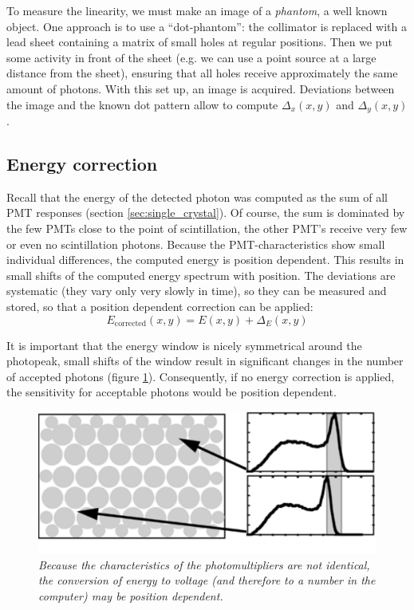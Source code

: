 To measure the linearity, we must make an image of a {\em phantom}, a well
known object. One approach is to use a ``dot-phantom'': the collimator is
replaced with a lead sheet containing a matrix of small holes at regular
positions. Then we put some activity in front of the sheet (e.g. we can use a
point source at a large distance from the sheet), ensuring that all holes
receive approximately the same amount of photons. With this set up, an image
is acquired. Deviations between the image and the known dot pattern allow to
compute $\Delta_x(x,y)$ and $\Delta_y(x,y)$.

\subsection{Energy correction}
Recall that the energy of the detected photon was computed as the sum of all
PMT responses (section \ref{sec:single_crystal}). Of course, the sum is
dominated by the few PMTs close to the point of scintillation, the other PMT's
receive very few or even no scintillation photons. Because the
PMT-characteristics show small individual differences, the computed energy is
position dependent. This results in small shifts of the computed energy
spectrum with position. The deviations are systematic (they vary only very
slowly in time), so they can be measured and stored, so that a position
dependent correction can be applied:
\begin{equation}
  E_{\mbox{corrected}}(x,y) = E(x,y) + \Delta_E(x,y)
\end{equation}

It is important that the energy window is nicely symmetrical around the
photopeak, small shifts of the window result in significant changes in the
number of accepted photons (figure \ref{fig:energy_corr}). Consequently, if no
energy correction is applied, the sensitivity for acceptable photons would be
position dependent.

\begin{figure}[tb]
\centering
\includegraphics[width=\figone]{figs/fig_energy_corr.pdf}
\caption{\label{fig:energy_corr} \emph{Because the characteristics of the
photomultipliers are not identical, the conversion of energy to voltage (and
therefore to a number in the computer) may be position dependent.}}
\end{figure}

